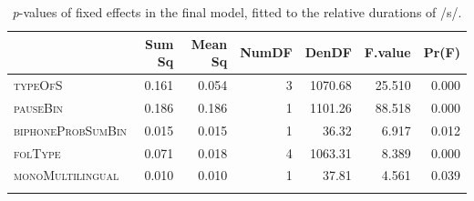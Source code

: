 \begin{table}\fontsize{10}{11}
\caption{\textit{p}-values of fixed effects in the final model, fitted to the relative durations of /s/.}
\label{tab:4.9}
\centering
\begin{tabular}{lrrrrrr} 
\lsptoprule
~                 & Sum Sq & Mean Sq & NumDF & DenDF   & F.value & Pr(F)  \\ 
\midrule
\textsc{typeOfS}           & 0.161  & 0.054   & 3     & 1070.68 & 25.510  & 0.000  \\
\textsc{pauseBin}          & 0.186  & 0.186   & 1     & 1101.26 & 88.518  & 0.000  \\
\textsc{biphoneProbSumBin} & 0.015  & 0.015   & 1     & 36.32   & 6.917   & 0.012  \\
\textsc{folType}           & 0.071  & 0.018   & 4     & 1063.31 & 8.389   & 0.000  \\
\textsc{monoMultilingual}  & 0.010  & 0.010   & 1     & 37.81   & 4.561   & 0.039  \\
\lspbottomrule
\end{tabular}
\end{table}




